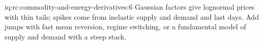 \begin{solution}{iq:rc:commodity-and-energy-derivatives:6}
Gaussian factors give lognormal prices with thin tails; spikes come from inelastic supply
and demand and last days. Add jumps with fast mean reversion, regime switching, or a
fundamental model of supply and demand with a steep stack.
\end{solution}
